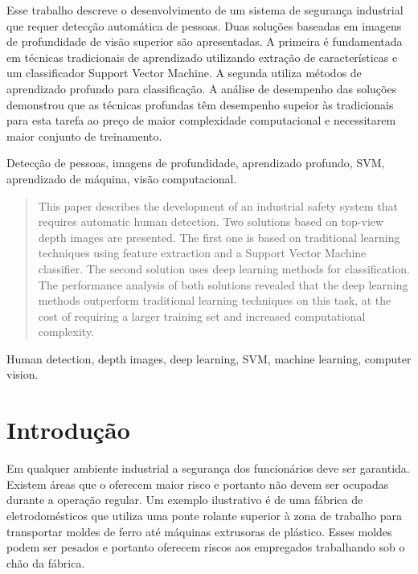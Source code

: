 \begin{resumo}
Esse trabalho descreve o desenvolvimento de um sistema de segurança industrial que requer detecção automática de pessoas. Duas soluções baseadas em imagens de profundidade de visão superior são apresentadas. A primeira é fundamentada em técnicas tradicionais de aprendizado utilizando extração de características e um classificador Support Vector Machine. A segunda utiliza métodos de aprendizado profundo para classificação. A análise de desempenho das soluções demonstrou que as técnicas profundas têm desempenho supeior às tradicionais para esta tarefa ao preço de maior complexidade computacional e necessitarem maior conjunto de treinamento.
\end{resumo}

\begin{chave}
Detecção de pessoas, imagens de profundidade, aprendizado profundo, SVM, aprendizado de máquina, visão computacional.
\end{chave}

\begin{abstract}
This paper describes the development of an industrial safety system that requires automatic human detection. Two solutions based on top-view depth images are presented. The first one is based on traditional learning techniques using feature extraction and a Support Vector Machine classifier. The second solution uses deep learning methods for classification. The performance analysis of both solutions revealed that the deep learning methods outperform traditional learning techniques on this task, at the cost of requiring a larger training set and increased computational complexity.
\end{abstract}

\begin{keywords}
  Human detection, depth images, deep learning, SVM, machine learning, computer vision.
\end{keywords}

\section{Introdução}
  Em qualquer ambiente industrial a segurança dos funcionários deve ser garantida. Existem áreas que o oferecem maior risco e portanto não devem ser ocupadas durante a operação regular. Um exemplo ilustrativo é de uma fábrica de eletrodomésticos que utiliza uma ponte rolante superior à zona de trabalho para transportar moldes de ferro até máquinas extrusoras de plástico. Esses moldes podem ser pesados e portanto oferecem riscos aos empregados trabalhando sob o chão da fábrica.


